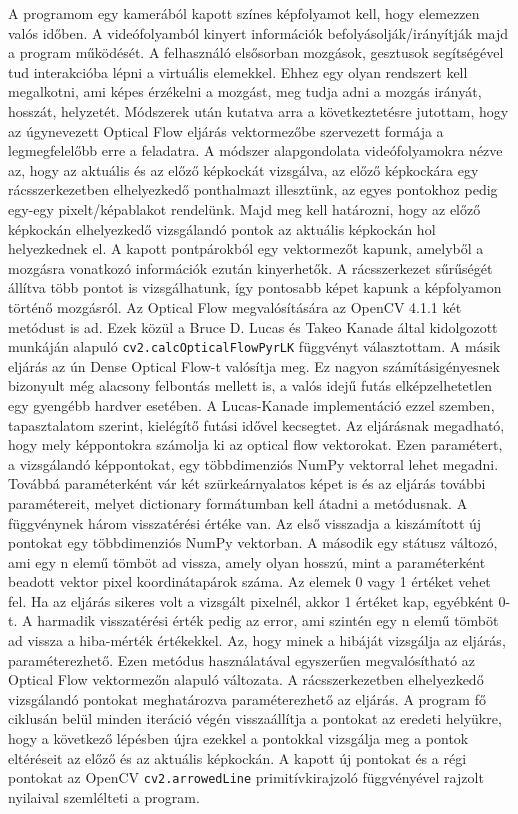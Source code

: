 \documentclass[a4paper]{article}
\begin{document}
A programom egy kamerából kapott színes képfolyamot kell, hogy elemezzen valós időben. A videófolyamból kinyert információk befolyásolják/irányítják majd a program működését. A felhasználó elsősorban mozgások, gesztusok segítségével tud interakcióba lépni a virtuális elemekkel. Ehhez egy olyan rendszert kell megalkotni, ami képes érzékelni a mozgást, meg tudja adni a mozgás irányát, hosszát, helyzetét. Módszerek után kutatva arra a következtetésre jutottam, hogy az úgynevezett Optical Flow eljárás vektormezőbe szervezett formája a legmegfelelőbb erre a feladatra. A módszer alapgondolata videófolyamokra nézve az, hogy az aktuális és az előző képkockát vizsgálva, az előző képkockára egy rácsszerkezetben elhelyezkedő ponthalmazt illesztünk, az egyes pontokhoz pedig egy-egy pixelt/képablakot rendelünk. Majd meg kell határozni, hogy az előző képkockán elhelyezkedő vizsgálandó pontok az aktuális képkockán hol helyezkednek el. A kapott pontpárokból egy vektormezőt kapunk, amelyből a mozgásra vonatkozó információk ezután kinyerhetők. A rácsszerkezet sűrűségét állítva több pontot is vizsgálhatunk, így pontosabb képet kapunk a képfolyamon történő mozgásról. 
Az Optical Flow megvalósítására az OpenCV 4.1.1 két metódust is ad. Ezek közül a Bruce D. Lucas és Takeo Kanade által kidolgozott munkáján alapuló \texttt{cv2.calcOpticalFlowPyrLK} függvényt választottam. A másik eljárás az ún Dense Optical Flow-t valósítja meg. Ez nagyon számításigényesnek bizonyult még alacsony felbontás mellett is, a valós idejű futás elképzelhetetlen egy gyengébb hardver esetében. A Lucas-Kanade implementáció ezzel szemben, tapasztalatom szerint, kielégítő futási idővel kecsegtet. Az eljárásnak megadható, hogy mely képpontokra számolja ki az optical flow vektorokat. Ezen paramétert, a vizsgálandó képpontokat, egy többdimenziós NumPy vektorral lehet megadni. Továbbá paraméterként vár két szürkeárnyalatos képet is és az eljárás további paramétereit, melyet dictionary formátumban kell átadni a metódusnak. A függvénynek három visszatérési értéke van. Az első visszadja a kiszámított új pontokat egy többdimenziós NumPy vektorban. A második egy státusz változó, ami egy n elemű tömböt ad vissza, amely olyan hosszú, mint a paraméterként beadott vektor pixel koordinátapárok száma. Az elemek 0 vagy 1 értéket vehet fel. Ha az eljárás sikeres volt a vizsgált pixelnél, akkor 1 értéket kap, egyébként 0-t. A harmadik visszatérési érték pedig az error, ami szintén egy n elemű tömböt ad vissza a hiba-mérték értékekkel. Az, hogy minek a hibáját vizsgálja az eljárás, paraméterezhető. Ezen metódus használatával egyszerűen megvalósítható az Optical Flow vektormezőn alapuló változata. A rácsszerkezetben elhelyezkedő vizsgálandó pontokat meghatározva paraméterezhető az eljárás. A program fő ciklusán belül minden iteráció végén visszaállítja a pontokat az eredeti helyükre, hogy a következő lépésben újra ezekkel a pontokkal vizsgálja meg a pontok eltéréseit az előző és az aktuális képkockán. A kapott új pontokat és a régi pontokat az OpenCV \texttt{cv2.arrowedLine} primitívkirajzoló függvényével rajzolt nyilaival szemlélteti a program.
\end{document}
